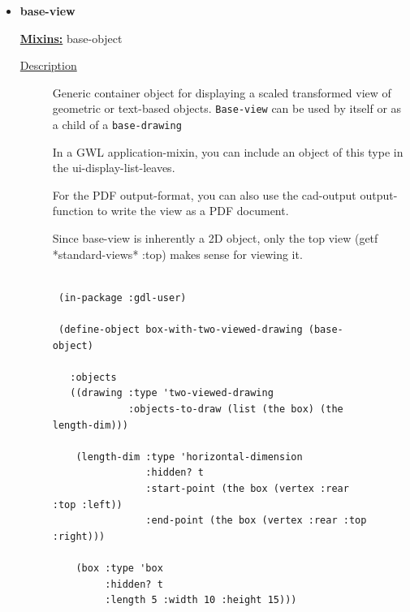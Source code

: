 \documentclass [11pt]{book}
\begin{document}
\begin{itemize}
\begin{description}
\end{description}







\item {}
\label{prim:base-view}
\textbf{base-view}


\textbf{
\underline{Mixins:}} base-object





\begin{description}

\item [
\underline{Description}]


Generic container object for displaying a scaled transformed view of geometric or 
text-based objects. \texttt{Base-view} can be used by itself or as a child of a \texttt{base-drawing}

In a GWL application-mixin, you can include an object of this type in the ui-display-list-leaves.

For the PDF output-format, you can also use the cad-output output-function to write the 
view as a PDF document. 

Since base-view is inherently a 2D object, only the top view (getf *standard-views* :top) 
makes sense for viewing it.



\end{description}




\begin{figure}
\begin{lrbox}{\boxedverb}
\begin{minipage}{\linewidth}
{\small

\begin{verbatim}
                 
 (in-package :gdl-user)

 (define-object box-with-two-viewed-drawing (base-object)
  
   :objects
   ((drawing :type 'two-viewed-drawing
             :objects-to-draw (list (the box) (the length-dim)))
    
    (length-dim :type 'horizontal-dimension
                :hidden? t
                :start-point (the box (vertex :rear :top :left))
                :end-point (the box (vertex :rear :top :right)))
   
    (box :type 'box
         :hidden? t
         :length 5 :width 10 :height 15)))


\end{verbatim}}
\end{minipage}
\end{lrbox}
\end{figure}
\end{itemize}
\end{document}

